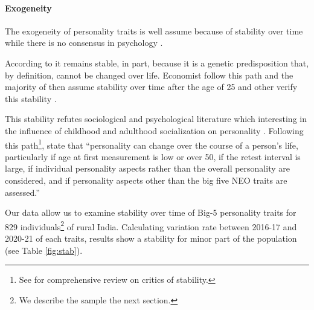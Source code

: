 \documentclass[a4paper, 11pt, onecolumn]{article}
\begin{document}
\paragraph{Exogeneity}
The exogeneity of personality traits is well assume because of stability over time while there is no consensus in psychology \citep{Ardelt2000}.

According to \cite{Costa1997, McCrae2000} it remains stable, in part, because it is a genetic predisposition that, by definition, cannot be changed over life.
Economist follow this path and the majority of then assume stability over time after the age of 25 and other verify this stability \citep{CobbClark2011}. 

This stability refutes sociological and psychological literature which interesting in the influence of childhood and adulthood socialization on personality \citep{Mortimer1978, Moen1995}.
Following this path\footnote{See \cite{Ardelt2000} for comprehensive review on critics of stability.}, \cite{Ardelt2000} state that ``personality can change over the course of a person's life, particularly if age at first measurement is low or over 50, if the retest interval is large, if individual personality aspects rather than the overall personality are considered, and if personality aspects other than the big five NEO traits are assessed.''


Our data allow us to examine stability over time of Big-5 personality traits for 829 individuals\footnote{We describe the sample the next section.} of rural India.
Calculating variation rate between 2016-17 and 2020-21 of each traits, results show a stability for minor part of the population (see Table \ref{fig:stab}).
\end{document}

